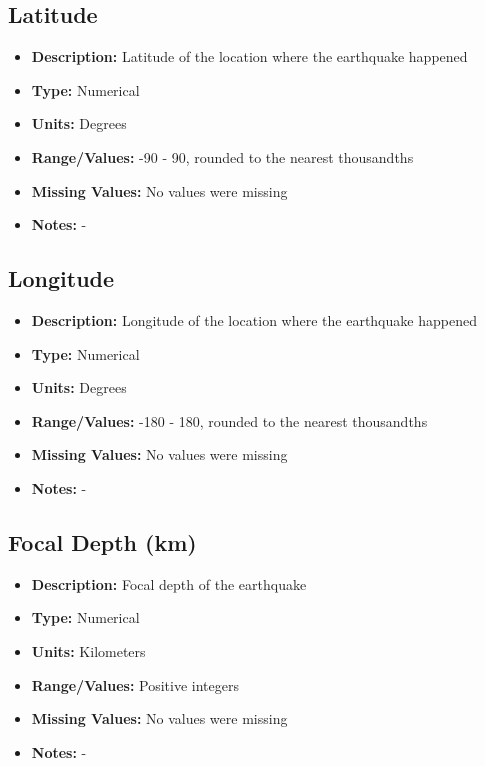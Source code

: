\documentclass[a4paper]{article}
\begin{document}
\subsection{Latitude}
\begin{itemize}
    \item \textbf{Description:} Latitude of the location where the earthquake happened
    \item \textbf{Type:} Numerical
    \item \textbf{Units:} Degrees
    \item \textbf{Range/Values:} -90 - 90, rounded to the nearest thousandths
    \item \textbf{Missing Values:} No values were missing
    \item \textbf{Notes:} -
\end{itemize}

\subsection{Longitude}
\begin{itemize}
    \item \textbf{Description:} Longitude of the location where the earthquake happened
    \item \textbf{Type:} Numerical
    \item \textbf{Units:} Degrees
    \item \textbf{Range/Values:} -180 - 180, rounded to the nearest thousandths
    \item \textbf{Missing Values:} No values were missing
    \item \textbf{Notes:} -
\end{itemize}

\subsection{Focal Depth (km)}
\begin{itemize}
    \item \textbf{Description:} Focal depth of the earthquake
    \item \textbf{Type:} Numerical
    \item \textbf{Units:} Kilometers
    \item \textbf{Range/Values:} Positive integers
    \item \textbf{Missing Values:} No values were missing
    \item \textbf{Notes:} -
\end{itemize}
\end{document}
